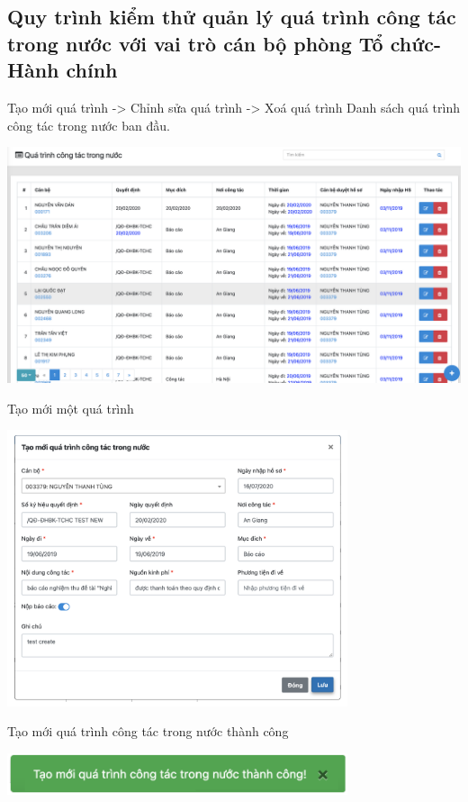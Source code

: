 \subsection{Quy trình kiểm thử quản lý quá trình công tác trong nước với vai trò cán bộ phòng Tổ chức-Hành chính}
Tạo mới quá trình -> Chỉnh sửa quá trình -> Xoá quá trình
\newpage
\noindent Danh sách quá trình công tác trong nước ban đầu.
\begin{center}
  \captionsetup{type=figure}
  \includegraphics[width=15cm]{img/test/viewFirst.png}
\end{center}
Tạo mới một quá trình
\begin{center}
  \captionsetup{type=figure}
  \includegraphics[width=10cm]{img/test/newForm.png}
\end{center}
Tạo mới quá trình công tác trong nước thành công
\begin{center}
  \captionsetup{type=figure}
  \includegraphics[width=10cm]{img/test/aleartNew.png}
\end{center}
